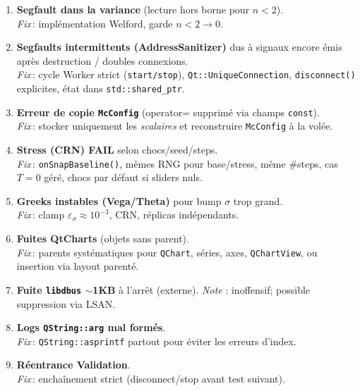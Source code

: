 \documentclass[11pt,a4paper]{article}
\newcommand{\fix}[1]{\\\emph{Fix}\,: #1}
\newcommand{\code}[1]{\texttt{#1}}
\begin{document}
\begin{enumerate}[leftmargin=*]
  \item \textbf{Segfault dans la variance} (lecture hors borne pour \(n<2\)). \fix{implémentation Welford, garde \(n<2\to 0\).}
  \item \textbf{Segfaults intermittents (AddressSanitizer)} dus à signaux encore émis après destruction / doubles connexions. \fix{cycle Worker strict (\code{start/stop}), \code{Qt::UniqueConnection}, \code{disconnect()} explicites, état dans \code{std::shared\_ptr}.}
  \item \textbf{Erreur de copie \code{McConfig}} (operator= supprimé via champs \code{const}). \fix{stocker uniquement les \emph{scalaires} et reconstruire \code{McConfig} à la volée.}
  \item \textbf{Stress (CRN) FAIL} selon chocs/seed/steps. \fix{\code{onSnapBaseline()}, mêmes RNG pour base/stress, même \#steps, cas \(T=0\) géré, chocs par défaut si sliders nuls.}
  \item \textbf{Greeks instables (Vega/Theta)} pour bump \(\sigma\) trop grand. \fix{clamp \(\varepsilon_\sigma \approx 10^{-3}\), CRN, réplicas indépendants.}
  \item \textbf{Fuites QtCharts} (objets sans parent). \fix{parents systématiques pour \code{QChart}, séries, axes, \code{QChartView}, ou insertion via layout parenté.}
  \item \textbf{Fuite \code{libdbus} \(\sim\)1KB} à l’arrêt (externe). \emph{Note} : inoffensif; possible suppression via LSAN.
  \item \textbf{Logs \code{QString::arg} mal formés}. \fix{\code{QString::asprintf} partout pour éviter les erreurs d’index.}
  \item \textbf{Réentrance Validation}. \fix{enchaînement strict (disconnect/stop avant test suivant).}
\end{enumerate}
\end{document}
